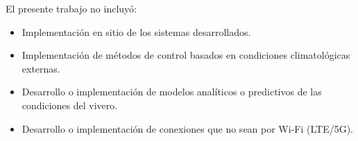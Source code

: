 El presente trabajo no incluyó:
\begin{itemize}
	\item Implementación en sitio de los sistemas desarrollados.
	\item Implementación de métodos de control basados en condiciones climatológicas externas.
	\item Desarrollo o implementación de modelos analíticos o predictivos de las condiciones del vivero.
	\item Desarrollo o implementación de conexiones que no sean por Wi-Fi (LTE/5G). 
	
\end{itemize}